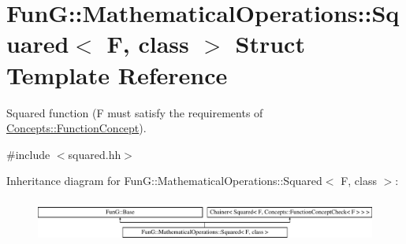 \hypertarget{structFunG_1_1MathematicalOperations_1_1Squared}{}\section{Fun\+G\+:\+:Mathematical\+Operations\+:\+:Squared$<$ F, class $>$ Struct Template Reference}
\label{structFunG_1_1MathematicalOperations_1_1Squared}


Squared function (F must satisfy the requirements of \hyperlink{structFunG_1_1Concepts_1_1FunctionConcept}{Concepts\+::\+Function\+Concept}).  




{\ttfamily \#include $<$squared.\+hh$>$}

Inheritance diagram for Fun\+G\+:\+:Mathematical\+Operations\+:\+:Squared$<$ F, class $>$\+:\begin{figure}[H]
\begin{center}
\leavevmode
\includegraphics[height=1.400000cm]{structFunG_1_1MathematicalOperations_1_1Squared}
\end{center}
\end{figure}
